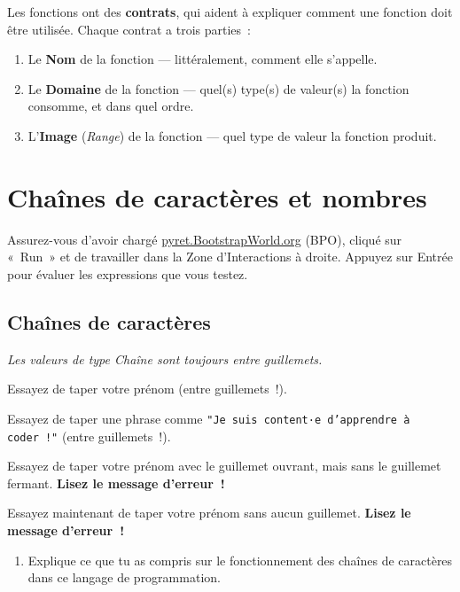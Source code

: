 \documentclass[12pt,a4paper]{article}
\newcommand{\pyret}[1]{\texttt{#1}}
\newcommand{\ligne}[1]{\vspace{0.3em}\par\noindent\dotfill\par\vspace{0.3em}}
\begin{document}
Les fonctions ont des \textbf{contrats}, qui aident à expliquer comment une fonction doit être utilisée. Chaque contrat a trois parties~:
\begin{enumerate}[leftmargin=*]
  \item Le \textbf{Nom} de la fonction — littéralement, comment elle s'appelle.
  \item Le \textbf{Domaine} de la fonction — quel(s) type(s) de valeur(s) la fonction consomme, et dans quel ordre.
  \item L'\textbf{Image} (\emph{Range}) de la fonction — quel type de valeur la fonction produit.
\end{enumerate}

\newpage

\section{Chaînes de caractères et nombres}

\begin{keypointbox}
  Assurez-vous d'avoir chargé \href{https://pyret.bootstrapworld.org}{pyret.BootstrapWorld.org} (BPO), cliqué sur «~Run~» et de travailler dans la Zone d'Interactions à droite. Appuyez sur Entrée pour évaluer les expressions que vous testez.
\end{keypointbox}

\subsection*{Chaînes de caractères}

\emph{Les valeurs de type Chaîne sont toujours entre guillemets.}

Essayez de taper votre prénom (entre guillemets~!).

Essayez de taper une phrase comme \pyret{"Je suis content·e d'apprendre à coder~!"} (entre guillemets~!).

Essayez de taper votre prénom avec le guillemet ouvrant, mais sans le guillemet fermant. \textbf{Lisez le message d'erreur~!}

Essayez maintenant de taper votre prénom sans aucun guillemet. \textbf{Lisez le message d'erreur~!}

\begin{enumerate}[leftmargin=*]
  \item Explique ce que tu as compris sur le fonctionnement des chaînes de caractères dans ce langage de programmation.

  \ligne{5}
\end{enumerate}
\end{document}
